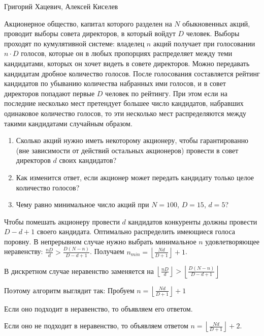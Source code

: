 \begin{problem}  \par
\begin{source}
Григорий Хацевич, Алексей Киселев
\end{source}
Акционерное общество, капитал которого разделен на $N$ обыкновенных акций, проводит выборы совета директоров, в который войдут $D$ человек. Выборы проходят по кумулятивной системе: владелец $n$ акций получает при голосовании $n\cdot D$ голосов, которые он в любых пропорциях распределяет между теми кандидатами, которых он хочет видеть в совете директоров. Можно передавать кандидатам дробное количество голосов. После голосования составляется рейтинг кандидатов по убыванию количества набранных ими голосов, и в совет директоров попадают первые $D$ человек по рейтингу. При этом если на последние несколько мест претендует большее число кандидатов, набравших одинаковое количество голосов, то эти несколько мест распределяются между такими кандидатами случайным образом. \par

\begin{enumerate}
\item Сколько акций нужно иметь некоторому акционеру, чтобы гарантированно (вне зависимости от действий остальных акционеров)  провести в совет директоров $d$ своих кандидатов? \par

\item Как изменится ответ, если акционер может передать кандидату только целое количество голосов? \par

\item Чему равно минимальное число акций при $N=100$, $D=15$, $d=5$?
\end{enumerate}


\begin{sol}

Чтобы помешать акционеру провести $d$ кандидатов конкуренты должны провести $D-d+1$ своего кандидата. Оптимально распределить имеющиеся голоса поровну.
В непрерывном случае нужно выбрать минимальное $n$ удовлетворяющее неравенству: $\frac{nD}{d}>\frac{D(N-n)}{D-d+1}$. Получаем $n_{min}= \left\lfloor \frac{Nd}{D+1}\right\rfloor+1$. \par
В дискретном случае неравенство заменяется на
$\left\lfloor \frac{nD}{d}\right\rfloor>\left\lfloor \frac{D(N-n)}{D-d+1}\right\rfloor$ \par
Поэтому алгоритм выглядит так:
Пробуем $n=\left\lfloor \frac{Nd}{D+1}\right\rfloor+1$ \par
Если оно подходит в неравенство, то объявляем его ответом. \par
Если оно не подходит в неравенство, то объявляем ответом $n=\left\lfloor \frac{Nd}{D+1}\right\rfloor+2$.
\end{sol}
\end{problem}






